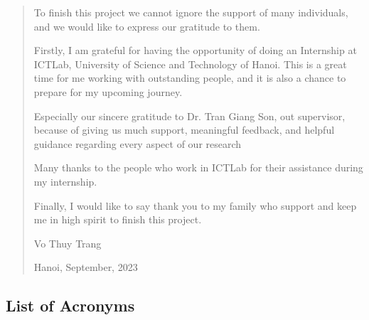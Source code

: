 \documentclass[
]{article}
\begin{document}
\begin{quote}
To finish this project we cannot ignore the support of many individuals,
and we would like to express our gratitude to them.

Firstly, I am grateful for having the opportunity of doing an Internship
at ICTLab, University of Science and Technology of Hanoi. This is a
great time for me working with outstanding people, and it is also a
chance to prepare for my upcoming journey.

Especially our sincere gratitude to Dr. Tran Giang Son, out supervisor,
because of giving us much support, meaningful feedback, and helpful
guidance regarding every aspect of our research

Many thanks to the people who work in ICTLab for their assistance during
my internship.

Finally, I would like to say thank you to my family who support and keep
me in high spirit to finish this project.

Vo Thuy Trang

Hanoi, September, 2023
\end{quote}

\hypertarget{list-of-acronyms}{%
\subsection{\texorpdfstring{\textbf{List of
Acronyms}}{List of Acronyms}}\label{list-of-acronyms}}
\end{document}
